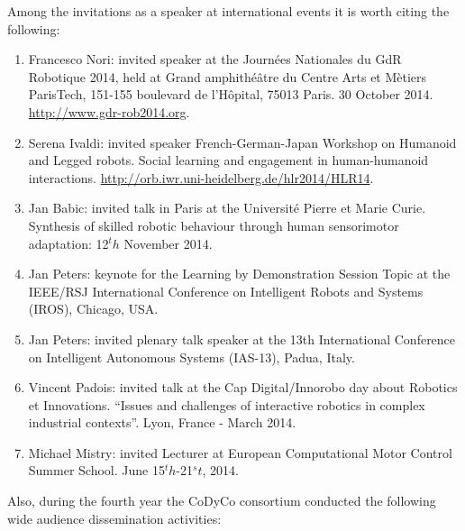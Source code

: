 \documentclass[12pt,a4paper,twoside]{article}
\begin{document}
Among the invitations as a speaker at international events it is worth citing the following:

\begin{enumerate}

\item Francesco Nori: invited speaker at the Journées Nationales du GdR Robotique 2014, held at Grand amphith\'e\^atre du Centre Arts et M\`etiers ParisTech, 151-155 boulevard de l'Hôpital, 75013 Paris. 30 October 2014. \url{http://www.gdr-rob2014.org}.

\item Serena Ivaldi: invited speaker French-German-Japan Workshop on Humanoid and Legged robots. Social learning and engagement in human-humanoid interactions. \url{http://orb.iwr.uni-heidelberg.de/hlr2014/HLR14}.

\item Jan Babic: invited talk in Paris at the Université Pierre et Marie Curie. Synthesis of skilled robotic behaviour through human sensorimotor adaptation:  12$^th$ November 2014.

\item Jan Peters: keynote for the Learning by Demonstration Session Topic at the IEEE/RSJ International Conference on Intelligent Robots and Systems (IROS), Chicago, USA.

\item Jan Peters: invited plenary talk speaker at the 13th International Conference on Intelligent Autonomous Systems (IAS-13), Padua, Italy.

\item Vincent Padois: invited talk at the Cap Digital/Innorobo day about Robotics et Innovations. ``Issues and challenges of interactive robotics in complex industrial contexts''. Lyon, France - March 2014.

\item Michael Mistry: invited Lecturer at European Computational Motor Control Summer School. June 15$^th$-21$^st$, 2014.

\end{enumerate} 

Also, during the fourth year the CoDyCo consortium conducted the following 
 wide audience dissemination activities:
 
\end{document}
